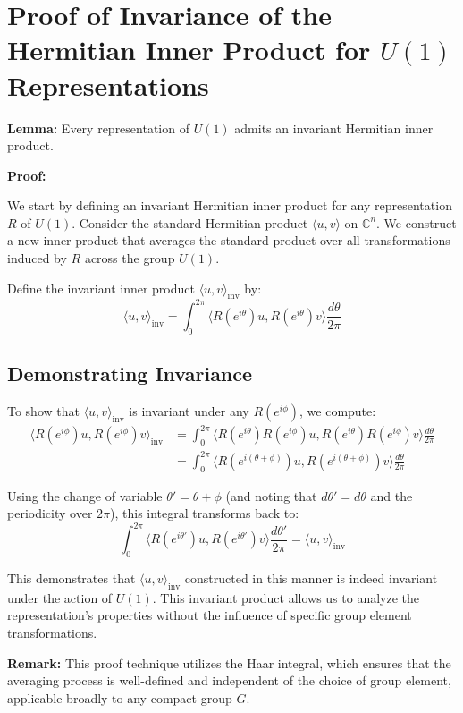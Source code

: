 \documentclass{article}
\begin{document}
\section*{Proof of Invariance of the Hermitian Inner Product for \(U(1)\) Representations}

\textbf{Lemma:} Every representation of \(U(1)\) admits an invariant Hermitian inner product.

\textbf{Proof:}

We start by defining an invariant Hermitian inner product for any representation \(R\) of \(U(1)\). Consider the standard Hermitian product \(\langle u, v \rangle\) on \(\mathbb{C}^n\). We construct a new inner product that averages the standard product over all transformations induced by \(R\) across the group \(U(1)\).

Define the invariant inner product \(\langle u, v \rangle_{\text{inv}}\) by:
\[
\langle u, v \rangle_{\text{inv}} = \int_0^{2\pi} \langle R(e^{i\theta}) u, R(e^{i\theta}) v \rangle \frac{d\theta}{2\pi}
\]

\subsection*{Demonstrating Invariance}

To show that \(\langle u, v \rangle_{\text{inv}}\) is invariant under any \(R(e^{i\phi})\), we compute:
\[
\begin{aligned}
\langle R(e^{i\phi}) u, R(e^{i\phi}) v \rangle_{\text{inv}} &= \int_0^{2\pi} \langle R(e^{i\theta}) R(e^{i\phi}) u, R(e^{i\theta}) R(e^{i\phi}) v \rangle \frac{d\theta}{2\pi} \\
&= \int_0^{2\pi} \langle R(e^{i(\theta+\phi)}) u, R(e^{i(\theta+\phi)}) v \rangle \frac{d\theta}{2\pi}
\end{aligned}
\]

Using the change of variable \(\theta' = \theta + \phi\) (and noting that \(d\theta' = d\theta\) and the periodicity over \(2\pi\)), this integral transforms back to:
\[
\int_0^{2\pi} \langle R(e^{i\theta'}) u, R(e^{i\theta'}) v \rangle \frac{d\theta'}{2\pi} = \langle u, v \rangle_{\text{inv}}
\]

This demonstrates that \(\langle u, v \rangle_{\text{inv}}\) constructed in this manner is indeed invariant under the action of \(U(1)\). This invariant product allows us to analyze the representation's properties without the influence of specific group element transformations.

\textbf{Remark:}
This proof technique utilizes the Haar integral, which ensures that the averaging process is well-defined and independent of the choice of group element, applicable broadly to any compact group \(G\).
\end{document}
